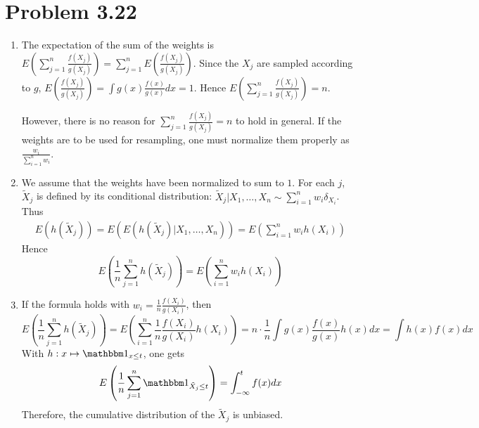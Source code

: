 \documentclass[a4paper,11pt]{article}
\begin{document}
\section*{Problem 3.22}

\begin{enumerate}[label=(\alph*)]
  \item The expectation of the sum of the weights is $\displaystyle E\left(\sum_{j=1}^n\frac{f(X_j)}{g(X_j)}\right) = \sum_{j=1}^nE\left(\frac{f(X_j)}{g(X_j)}\right)$. Since the $X_j$ are sampled according to $g$, $\displaystyle E\left(\frac{f(X_j)}{g(X_j)}\right) = \int g(x) \frac{f(x)}{g(x)}dx = 1$. Hence $\displaystyle E\left(\sum_{j=1}^n\frac{f(X_j)}{g(X_j)}\right) =n$.

  However, there is no reason for $\sum_{j=1}^n\frac{f(X_j)}{g(X_j)} = n$ to hold in general. If the weights are to be used for resampling, one must normalize them properly as $\frac{w_i}{\sum_{i=1}^n w_i}$.

  \item We assume that the weights have been normalized to sum to $1$. For each $j$, $\tilde X_j$ is defined by its conditional distribution: $\tilde X_j|X_1,\ldots,X_n \sim \sum_{i=1}^n w_i \delta_{X_i}$. Thus $$\begin{aligned}
    E(h(\tilde X_j)) = E(E(h(\tilde X_j)|X_1,\ldots, X_n)) = E(\sum_{i=1}^n w_ih(X_i))
  \end{aligned}$$
  Hence $$ E\left(\frac 1n \sum_{j=1}^n h(\tilde X_j)\right) = E\left(\sum_{i=1}^n w_ih(X_i)\right)$$

  \item If the formula holds with $w_i = \frac 1n\frac{f(X_i)}{g(X_i)}$, then $$E\left(\frac 1n \sum_{j=1}^n h(\tilde X_j)\right) =E\left(\sum_{i=1}^n \frac 1n \frac{f(X_i)}{g(X_i)} h(X_i)\right) =n\cdot\frac 1n \int g(x) \frac{f(x)}{g(x)}h(x)dx = \int h(x)f(x)dx$$
  With $h:x \mapsto \mathbbm 1_{x\leq t}$, one gets $$E\left(\frac 1n \sum_{j=1}^n \mathbbm 1_{\tilde X_j\leq t}\right)  = \int_{-\infty}^t f(x)dx$$
  Therefore, the cumulative distribution of the $\tilde X_j$ is unbiased.
\end{enumerate}
\end{document}
